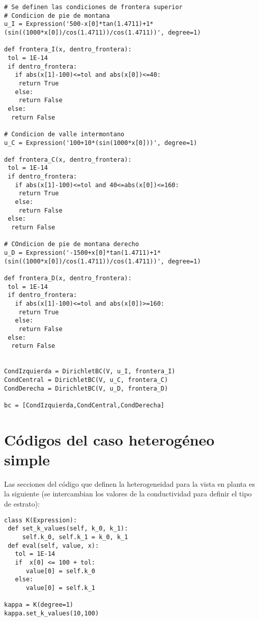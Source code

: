 \begin{lstlisting}[frame=single]
# Se definen las condiciones de frontera superior
# Condicion de pie de montana
u_I = Expression('500-x[0]*tan(1.4711)+1*(sin((1000*x[0])/cos(1.4711))/cos(1.4711))', degree=1)

def frontera_I(x, dentro_frontera):
 tol = 1E-14
 if dentro_frontera:
   if abs(x[1]-100)<=tol and abs(x[0])<=40:
    return True
   else:
    return False
 else:
  return False

# Condicion de valle intermontano 
u_C = Expression('100+10*(sin(1000*x[0]))', degree=1)

def frontera_C(x, dentro_frontera):
 tol = 1E-14
 if dentro_frontera:
   if abs(x[1]-100)<=tol and 40<=abs(x[0])<=160:
    return True
   else:
    return False
 else:
  return False

# COndicion de pie de montana derecho
u_D = Expression('-1500+x[0]*tan(1.4711)+1*(sin((1000*x[0])/cos(1.4711))/cos(1.4711))', degree=1)

def frontera_D(x, dentro_frontera):
 tol = 1E-14
 if dentro_frontera:
   if abs(x[1]-100)<=tol and abs(x[0])>=160:
    return True
   else:
    return False
 else:
  return False


CondIzquierda = DirichletBC(V, u_I, frontera_I)
CondCentral = DirichletBC(V, u_C, frontera_C)
CondDerecha = DirichletBC(V, u_D, frontera_D)

bc = [CondIzquierda,CondCentral,CondDerecha]

\end{lstlisting}

\newpage


\section{Códigos del caso heterogéneo simple}

Las secciones del código que definen la heterogeneidad para la vista en planta es la siguiente (se intercambian los valores de la conductividad para definir el tipo de estrato):

\lstset{language=python}
\begin{lstlisting}[frame=single]
class K(Expression):
 def set_k_values(self, k_0, k_1):
     self.k_0, self.k_1 = k_0, k_1
 def eval(self, value, x):
   tol = 1E-14 
   if  x[0] <= 100 + tol:
      value[0] = self.k_0
   else:
      value[0] = self.k_1

kappa = K(degree=1)
kappa.set_k_values(10,100)

\end{lstlisting}

